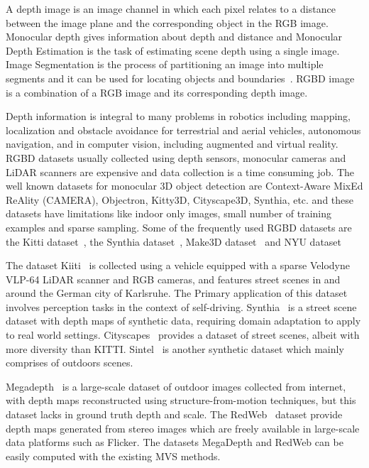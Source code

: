 \documentclass[review]{cvpr}
\begin{document}
A depth image is an image channel in which each pixel relates to a distance between the image plane and the corresponding object in the RGB image. Monocular depth gives information about depth and distance and Monocular Depth Estimation is the task of estimating scene depth using a single image\cite{abuolaim2020defocus}. Image Segmentation is the process of partitioning an image into multiple segments and it can be used for locating objects and boundaries~\cite{amza2012review}. RGBD image is a combination of a RGB image and its corresponding depth image\cite{zhang2018deep}.
 
Depth information is integral to many problems in robotics including mapping, localization and obstacle avoidance for terrestrial and aerial vehicles, autonomous navigation, and in computer vision, including augmented and virtual reality\cite{marchand2015pose}. RGBD datasets usually collected using depth sensors, monocular cameras and LiDAR scanners are expensive and data collection is a time consuming job. The well known datasets for monocular 3D object detection are Context-Aware MixEd ReAlity (CAMERA), Objectron, Kitty3D, Cityscape3D, Synthia, etc. and these datasets have limitations like indoor only images, small number of training examples and sparse sampling. Some of the frequently used RGBD datasets are the Kitti dataset~\cite{geiger2013vision}, the Synthia dataset~\cite{ros2016synthia}, Make3D dataset~\cite{saxena2008make3d} and NYU dataset~\cite{silberman2012indoor}

The dataset Kiiti~\cite{geiger2013vision} is collected using a vehicle equipped with a sparse Velodyne VLP-64 LiDAR scanner and RGB cameras, and features street scenes in and around the German city of Karlsruhe. The Primary application of this dataset involves perception tasks in the context of self-driving. Synthia~\cite{ros2016synthia} is a street scene dataset with depth maps of synthetic data, requiring domain adaptation to apply to real world settings. Cityscapes~\cite{cordts2016cityscapes} provides a dataset of street scenes, albeit with more diversity than KITTI. Sintel~\cite{mayer2016large} is another synthetic dataset which mainly comprises of outdoors scenes.

Megadepth~\cite{li2018megadepth} is a large-scale dataset of outdoor images collected from internet, with depth maps reconstructed using structure-from-motion techniques, but this dataset lacks in ground truth depth and scale. The RedWeb~\cite{xian2018monocular} dataset provide depth maps generated from stereo images which are freely available in large-scale data platforms such as Flicker. The datasets MegaDepth and RedWeb can be easily computed with the existing MVS methods.
\end{document}
